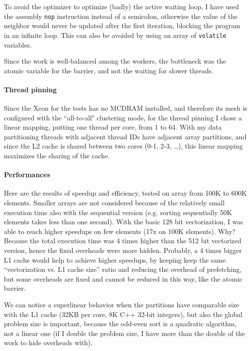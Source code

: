 To avoid the optimizer to optimize (badly) the active waiting loop, I have used the assembly \texttt{nop} instruction instead of a semicolon, otherwise the value of the neighbor would never be updated after the first iteration, blocking the program in an infinite loop. This can also be avoided by using an array of \texttt{volatile} variables.

Since the work is well-balanced among the workers, the bottleneck was the atomic variable for the barrier, and not the waiting for slower threads.

\paragraph{Thread pinning}
Since the Xeon for the tests has no MCDRAM installed, and therefore its mesh is configured with the ``all-to-all" clustering mode, for the thread pinning I chose a linear mapping, putting one thread per core, from 1 to 64. With my data partitioning threads with adjacent thread IDs have adjacent array partitions, and since the L2 cache is shared between two cores (0-1, 2-3, \dots), this linear mapping maximizes the sharing of the cache.

\paragraph{Performances}
Here are the results of speedup and efficiency, tested on array from 100K to 600K elements. Smaller arrays are not considered because of the relatively small execution time also with the sequential version (e.g. sorting sequentially 50K elements takes less than one second). With the basic 128 bit vectorization, I was able to reach higher speedups on few elements (17x on 100K elements). Why? Because the total execution time was 4 times higher than the 512 bit vectorized version, hence the fixed overheads were more hidden. Probably, a 4 times bigger L1 cache would help to achieve higher speedups, by keeping keep the same ``vectorization vs. L1 cache size'' ratio and reducing the overhead of prefetching, but some overheads are fixed and cannot be reduced in this way, like the atomic barrier.

We can notice a superlinear behavior when the partitions have comparable size with the L1 cache (32KB per core, 8K C++ 32-bit integers), but also the global problem size is important, because the odd-even sort is a quadratic algorithm, not a linear one (if I double the problem size, I have more than the double of the work to hide overheads with).
\bigbreak

